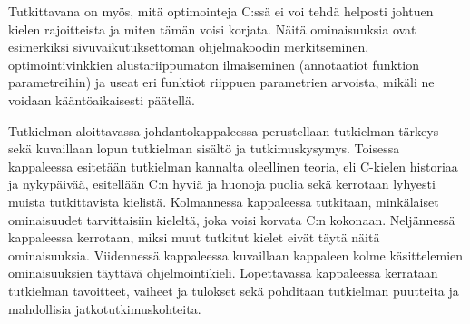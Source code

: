Tutkittavana on myös, mitä optimointeja C:ssä ei voi tehdä helposti johtuen
kielen rajoitteista ja miten tämän voisi korjata. Näitä ominaisuuksia ovat
esimerkiksi sivuvaikutuksettoman ohjelmakoodin merkitseminen,
optimointivinkkien alustariippumaton ilmaiseminen (annotaatiot funktion
parametreihin) ja useat eri funktiot riippuen parametrien arvoista, mikäli ne
voidaan kääntöaikaisesti päätellä.

Tutkielman aloittavassa johdantokappaleessa perustellaan tutkielman tärkeys
sekä kuvaillaan lopun tutkielman sisältö ja tutkimuskysymys.
Toisessa kappaleessa esitetään tutkielman kannalta oleellinen teoria, eli
C-kielen historiaa ja nykypäivää, esitellään C:n hyviä ja huonoja puolia sekä
kerrotaan lyhyesti muista tutkittavista kielistä.
Kolmannessa kappaleessa tutkitaan, minkälaiset ominaisuudet tarvittaisiin
kieleltä, joka voisi korvata C:n kokonaan.
Neljännessä kappaleessa kerrotaan, miksi muut tutkitut kielet eivät täytä näitä
ominaisuuksia.
Viidennessä kappaleessa kuvaillaan kappaleen kolme käsittelemien ominaisuuksien
täyttävä ohjelmointikieli.
Lopettavassa kappaleessa kerrataan tutkielman tavoitteet, vaiheet ja tulokset
sekä pohditaan tutkielman puutteita ja mahdollisia jatkotutkimuskohteita.
